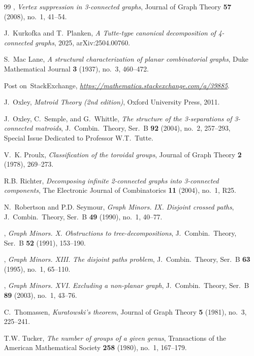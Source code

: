 \documentclass{aic}
\theoremstyle{plain}
\theoremstyle{definition}
\theoremstyle{plain}
\theoremstyle{plain}
\begin{document}
\begin{thebibliography}{99}
\bysame, \emph{Vertex suppression in 3-connected graphs}, Journal of Graph
  Theory \textbf{57} (2008), no.~1, 41--54.

J.~Kurkofka and T.~Planken, \emph{A {T}utte-type canonical decomposition of
  4-connected graphs}, 2025, arXiv:2504.00760.

S.~Mac Lane, \emph{{A structural characterization of planar combinatorial
  graphs}}, Duke Mathematical Journal \textbf{3} (1937), no.~3, 460--472.

Post on~StackExchange,
  \emph{\href{https://mathematica.stackexchange.com/a/39885}{https://mathematica.stackexchange.com/a/39885}}.

J.~Oxley, \emph{{M}atroid {T}heory \emph{(2nd edition)}}, Oxford University
  Press, 2011.

J.~Oxley, C.~Semple, and G.~Whittle, \emph{The structure of the 3-separations
  of 3-connected matroids}, J.~Combin.\ Theory, Ser.~B \textbf{92} (2004),
  no.~2, 257--293, Special Issue Dedicated to Professor W.T.~Tutte.

V.~K. Proulx, \emph{Classification of the toroidal groups}, Journal of Graph
  Theory \textbf{2} (1978), 269--273.

R.B. Richter, \emph{Decomposing infinite 2-connected graphs into 3-connected
  components}, The Electronic Journal of Combinatorics \textbf{11} (2004),
  no.~1, R25.

N.~Robertson and P.D. Seymour, \emph{Graph {M}inors. {IX}. {D}isjoint crossed
  paths}, J.~Combin.\ Theory, Ser.~B \textbf{49} (1990), no.~1, 40--77.

\bysame, \emph{Graph {M}inors. {X}. {O}bstructions to tree-decompositions},
  J.~Combin.\ Theory, Ser.~B \textbf{52} (1991), 153--190.

\bysame, \emph{Graph {M}inors. {XIII}. {T}he disjoint paths problem},
  J.~Combin.\ Theory, Ser.~B \textbf{63} (1995), no.~1, 65--110.

\bysame, \emph{Graph {M}inors. {XVI}. {E}xcluding a non-planar graph},
  J.~Combin.\ Theory, Ser.~B \textbf{89} (2003), no.~1, 43--76.

C.~Thomassen, \emph{Kuratowski's theorem}, Journal of Graph Theory \textbf{5}
  (1981), no.~3, 225--241.

T.W. Tucker, \emph{The number of groups of a given genus}, Transactions of the
  American Mathematical Society \textbf{258} (1980), no.~1, 167--179.


\end{thebibliography}
\end{document}
